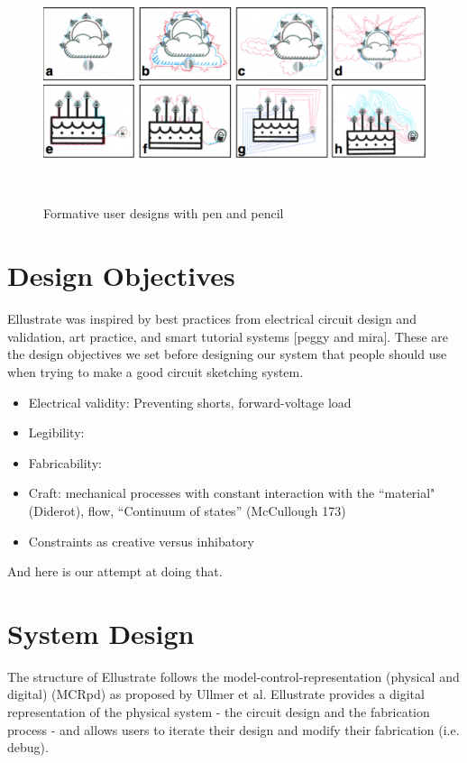 \documentclass{sigchi}
\begin{document}
\begin{figure}
\centering
  \includegraphics[width=1\columnwidth]{figures/Ellustrate_figures_formative_user_design}
  \caption{Formative user designs with pen and pencil}~\label{fig:formative_user_design}
\end{figure}

\section{Design Objectives}
Ellustrate was inspired by best practices from electrical circuit design and validation, art practice, and smart tutorial systems [peggy and mira].
These are the design objectives we set before designing our system that people should use when trying to make a good circuit sketching system. 
    \begin{itemize}
        \item Electrical validity: Preventing shorts, forward-voltage load
        \item Legibility:
        \item Fabricability:
    \end{itemize}

    \begin{itemize}
        \item Craft: mechanical processes with constant interaction with the ``material" (Diderot), flow, ``Continuum of states'' (McCullough 173)
        \item Constraints as creative versus inhibatory
    \end{itemize}
And here is our attempt at doing that. 


\section{System Design}
The structure of Ellustrate follows the model-control-representation (physical and digital) (MCRpd) as proposed by Ullmer et al. Ellustrate provides a digital representation of the physical system - the circuit design and the fabrication process - and allows users to iterate their design and modify their fabrication (i.e. debug). 
\end{document}
